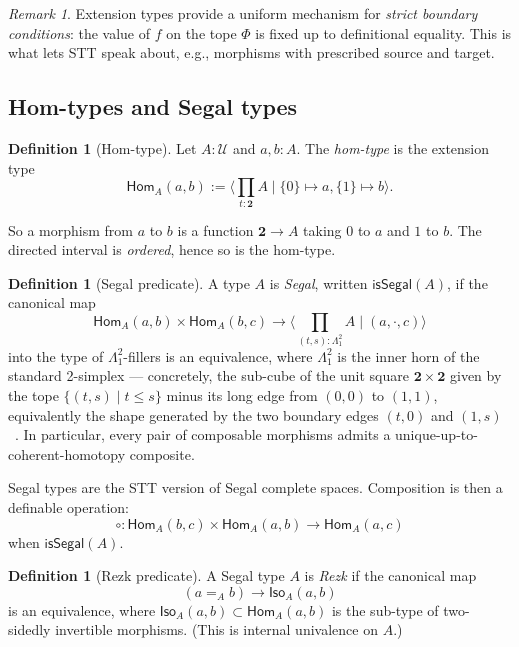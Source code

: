 \documentclass[12pt]{article}
\theoremstyle{definition}
\newtheorem{definition}[theorem]{Definition}
\theoremstyle{remark}
\newtheorem{remark}[theorem]{Remark}
\newcommand{\U}{\mathcal{U}}
\newcommand{\Hom}{\mathsf{Hom}}
\newcommand{\isSegal}{\mathsf{isSegal}}
\newcommand{\twoI}{\mathbf{2}}
\newcommand{\seg}{\Lambda}
\begin{document}
\begin{remark}
Extension types provide a uniform mechanism for \emph{strict boundary conditions}: the value of $f$ on the tope $\Phi$ is fixed up to definitional equality. This is what lets STT speak about, e.g., morphisms with prescribed source and target.
\end{remark}

\subsection{Hom-types and Segal types}

\begin{definition}[Hom-type]\label{def:hom}
Let $A : \U$ and $a, b : A$. The \emph{hom-type} is the extension type
\[
\Hom_A(a,b) := \big\langle \prod_{t : \twoI} A \;\big|\; \{0\} \mapsto a, \{1\} \mapsto b \big\rangle.
\]
\end{definition}

So a morphism from $a$ to $b$ is a function $\twoI \to A$ taking $0$ to $a$ and $1$ to $b$. The directed interval is \emph{ordered}, hence so is the hom-type.

\begin{definition}[Segal predicate]\label{def:segal}
A type $A$ is \emph{Segal}, written $\isSegal(A)$, if the canonical map
\[
\Hom_A(a,b) \times \Hom_A(b,c) \to \Big\langle \prod_{(t,s) : \seg^2_1} A \;\big|\; (a, \cdot, c) \Big\rangle
\]
into the type of $\seg^2_1$-fillers is an equivalence, where $\seg^2_1$ is the inner horn of the standard 2-simplex --- concretely, the sub-cube of the unit square $\twoI \times \twoI$ given by the tope $\{ (t,s) \mid t \le s \}$ minus its long edge from $(0,0)$ to $(1,1)$, equivalently the shape generated by the two boundary edges $(t,0)$ and $(1,s)$~\cite[\S 5]{RiehlShulman}. In particular, every pair of composable morphisms admits a unique-up-to-coherent-homotopy composite.
\end{definition}

Segal types are the STT version of Segal complete spaces. Composition is then a definable operation:
\[
\circ : \Hom_A(b,c) \times \Hom_A(a,b) \to \Hom_A(a,c)
\]
when $\isSegal(A)$.

\begin{definition}[Rezk predicate]\label{def:rezk}
A Segal type $A$ is \emph{Rezk} if the canonical map
\[
(a =_A b) \to \mathsf{Iso}_A(a,b)
\]
is an equivalence, where $\mathsf{Iso}_A(a,b) \subset \Hom_A(a,b)$ is the sub-type of two-sidedly invertible morphisms. (This is internal univalence on $A$.)
\end{definition}
\end{document}

